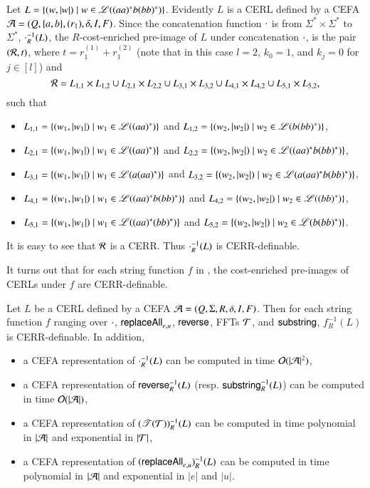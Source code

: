 \begin{example}\label{exm:pre-image}
Let $L = \{(w, |w|) \mid w \in \mathscr{L}((aa)^*b(bb)^*) \}$. Evidently $L$  is a CERL defined by a CEFA $\mathcal{A} = (Q, \{a,b\}, (r_1), \delta, I, F)$. Since the concatenation function $\cdot$  is  from $\Sigma^* \times \Sigma^*$ to $\Sigma^*$, $\cdot^{-1}_R(L)$, the $R$-cost-enriched pre-image of $L$ under concatenation $\cdot$, is the pair $(\mathcal{R}, t)$, where $t=r^{(1)}_1+r^{(2)}_1$ (note that in this case $l=2$, $k_0=1$, and $k_j=0$ for $j\in [l]$) and 
\[\mathcal{R} = L_{1,1} \times L_{1,2} \cup L_{2,1} \times L_{2,2} \cup L_{3,1} \times L_{3,2} \cup L_{4,1} \times L_{4,2} \cup L_{5,1} \times L_{5,2},\]
such that
\begin{itemize}
\item $L_{1,1} = \{(w_1, |w_1|) \mid w_1 \in \mathscr{L}((aa)^*)\}$ and $L_{1,2} = \{(w_2, |w_2|) \mid w_2 \in \mathscr{L}(b(bb)^*)\}$,
%
\item $L_{2,1} = \{(w_1, |w_1|) \mid w_1 \in \mathscr{L}((aa)^*)\}$ and $L_{2,2} = \{(w_2, |w_2|) \mid w_2 \in \mathscr{L}((aa)^*b(bb)^*)\}$,
%
\item $L_{3,1} = \{(w_1, |w_1|) \mid w_1 \in \mathscr{L}(a(aa)^*)\}$ and $L_{3,2} = \{(w_2, |w_2|) \mid w_2 \in \mathscr{L}(a(aa)^*b(bb)^*)\}$,
%
\item $L_{4,1} = \{(w_1, |w_1|) \mid w_1 \in \mathscr{L}((aa)^*b(bb)^*)\}$ and $L_{4,2} = \{(w_2, |w_2|) \mid w_2 \in \mathscr{L}((bb)^*)\}$,
%
\item $L_{5,1} = \{(w_1, |w_1|) \mid w_1 \in \mathscr{L}((aa)^*(bb)^*)\}$ and $L_{5,2} = \{(w_2, |w_2|) \mid w_2 \in \mathscr{L}(b(bb)^*)\}$.
\end{itemize}

It is easy to see that $\mathcal{R}$ is a CERR. Thus $\cdot^{-1}_R(L)$ is CERR-definable.
\end{example}

It turns out that for each string function $f$ in {\slint}, the cost-enriched pre-images of CERLs under $f$ are CERR-definable.

\begin{proposition}\label{prop:pre-image}
Let $L$ be a CERL defined by a CEFA $\mathcal{A} = (Q, \Sigma, R, \delta, I, F)$. Then for each string function $f$ ranging over $\cdot$, $\mathsf{replaceAll}_{e,u}$, $\mathsf{reverse}$, FFTs $\mathcal{T}$, and $\mathsf{substring}$, $f^{-1}_R(L)$ is CERR-definable. In addition,
\begin{itemize}
\item a CEFA representation of $\cdot^{-1}_R(L)$ can be computed in time $\mathcal{O}(|\mathcal{A}|^2)$, 
%
\item a CEFA representation of $\mathsf{reverse}^{-1}_R(L)$ (resp. $\mathsf{substring}^{-1}_R(L)$) can be computed in time $\mathcal{O}(|\mathcal{A}|)$,
%
\item a CEFA representation of  $(\mathscr{T}(\mathcal{T}))^{-1}_R(L)$ can be computed in time polynomial in $|\mathcal{A}|$ and exponential in $|\mathcal{T}|$,
%
\item a CEFA representation of  $(\mathsf{replaceAll}_{e,u})^{-1}_R(L)$ can be computed in time polynomial in $|\mathcal{A}|$ and exponential in $|e|$ and $|u|$.
\end{itemize}
\end{proposition}



